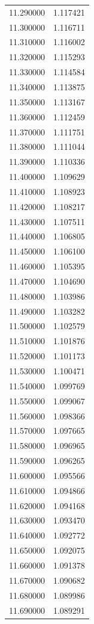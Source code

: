 \begin{tabular}{rr}
11.290000 & 1.117421 \\
11.300000 & 1.116711 \\
11.310000 & 1.116002 \\
11.320000 & 1.115293 \\
11.330000 & 1.114584 \\
11.340000 & 1.113875 \\
11.350000 & 1.113167 \\
11.360000 & 1.112459 \\
11.370000 & 1.111751 \\
11.380000 & 1.111044 \\
11.390000 & 1.110336 \\
11.400000 & 1.109629 \\
11.410000 & 1.108923 \\
11.420000 & 1.108217 \\
11.430000 & 1.107511 \\
11.440000 & 1.106805 \\
11.450000 & 1.106100 \\
11.460000 & 1.105395 \\
11.470000 & 1.104690 \\
11.480000 & 1.103986 \\
11.490000 & 1.103282 \\
11.500000 & 1.102579 \\
11.510000 & 1.101876 \\
11.520000 & 1.101173 \\
11.530000 & 1.100471 \\
11.540000 & 1.099769 \\
11.550000 & 1.099067 \\
11.560000 & 1.098366 \\
11.570000 & 1.097665 \\
11.580000 & 1.096965 \\
11.590000 & 1.096265 \\
11.600000 & 1.095566 \\
11.610000 & 1.094866 \\
11.620000 & 1.094168 \\
11.630000 & 1.093470 \\
11.640000 & 1.092772 \\
11.650000 & 1.092075 \\
11.660000 & 1.091378 \\
11.670000 & 1.090682 \\
11.680000 & 1.089986 \\
11.690000 & 1.089291 \\

\end{tabular}
